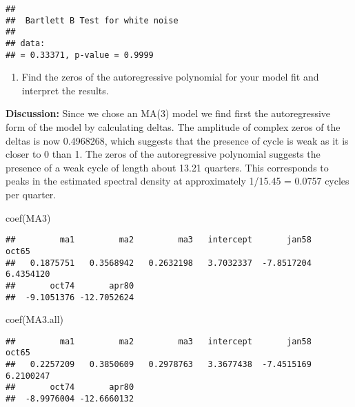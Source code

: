 \documentclass[
]{article}
\newenvironment{Shaded}{\begin{snugshade}}{\end{snugshade}}
\newcommand{\FunctionTok}[1]{\textcolor[rgb]{0.00,0.00,0.00}{#1}}
\newcommand{\NormalTok}[1]{#1}
\providecommand{\tightlist}{%
  \setlength{\itemsep}{0pt}\setlength{\parskip}{0pt}}
\begin{document}
\begin{verbatim}
## 
##  Bartlett B Test for white noise
## 
## data:  
## = 0.33371, p-value = 0.9999
\end{verbatim}

\begin{enumerate}
\def\labelenumi{(\alph{enumi})}
\setcounter{enumi}{21}
\tightlist
\item
  Find the zeros of the autoregressive polynomial for your model fit and
  interpret the results.
\end{enumerate}

\textbf{Discussion:} Since we chose an MA(3) model we find first the
autoregressive form of the model by calculating deltas. The amplitude of
complex zeros of the deltas is now 0.4968268, which suggests that the
presence of cycle is weak as it is closer to 0 than 1. The zeros of the
autoregressive polynomial suggests the presence of a weak cycle of
length about 13.21 quarters. This corresponds to peaks in the estimated
spectral density at approximately 1/15.45 = 0.0757 cycles per quarter.

\begin{Shaded}
\begin{Highlighting}[]
\FunctionTok{coef}\NormalTok{(MA3)}
\end{Highlighting}
\end{Shaded}

\begin{verbatim}
##         ma1         ma2         ma3   intercept       jan58       oct65 
##   0.1875751   0.3568942   0.2632198   3.7032337  -7.8517204   6.4354120 
##       oct74       apr80 
##  -9.1051376 -12.7052624
\end{verbatim}

\begin{Shaded}
\begin{Highlighting}[]
\FunctionTok{coef}\NormalTok{(MA3.all)}
\end{Highlighting}
\end{Shaded}

\begin{verbatim}
##         ma1         ma2         ma3   intercept       jan58       oct65 
##   0.2257209   0.3850609   0.2978763   3.3677438  -7.4515169   6.2100247 
##       oct74       apr80 
##  -8.9976004 -12.6660132
\end{verbatim}
\end{document}
